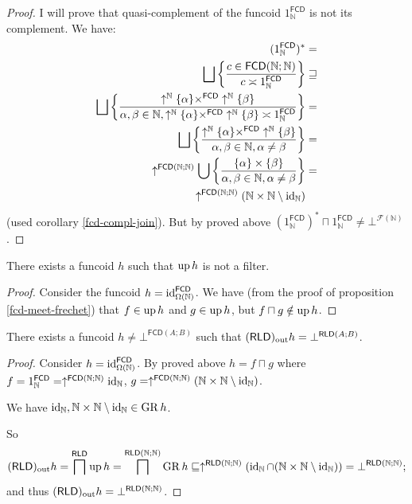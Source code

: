 \begin{proof}
I will prove that quasi-complement of the funcoid $1_{\mathbb{N}}^{\mathsf{FCD}}$
is not its complement. We have:
\begin{align*}
(1_{\mathbb{N}}^{\mathsf{FCD}})^{\ast} & =\\
\bigsqcup\left\{ \frac{c\in\mathsf{FCD}(\mathbb{N};\mathbb{N})}{c\asymp1_{\mathbb{N}}^{\mathsf{FCD}}}\right\} & \sqsupseteq\\
\bigsqcup\left\{ \frac{\uparrow^{\mathbb{N}}\{\alpha\}\times^{\mathsf{FCD}}\uparrow^{\mathbb{N}}\{\beta\}}{\alpha,\beta\in\mathbb{N},\uparrow^{\mathbb{N}}\{\alpha\}\times^{\mathsf{FCD}}\uparrow^{\mathbb{N}}\{\beta\}\asymp1_{\mathbb{N}}^{\mathsf{FCD}}}\right\} & =\\
\bigsqcup\left\{ \frac{\uparrow^{\mathbb{N}}\{\alpha\}\times^{\mathsf{FCD}}\uparrow^{\mathbb{N}}\{\beta\}}{\alpha,\beta\in\mathbb{N},\alpha\ne\beta}\right\} & =\\
\uparrow^{\mathsf{FCD}(\mathbb{N};\mathbb{N})}\bigcup\left\{ \frac{\{\alpha\}\times\{\beta\}}{\alpha,\beta\in\mathbb{N},\alpha\ne\beta}\right\} & =\\
\uparrow^{\mathsf{FCD}(\mathbb{N};\mathbb{N})}(\mathbb{N}\times\mathbb{N}\setminus\operatorname{id}_{\mathbb{N}})
\end{align*}
(used corollary \ref{fcd-compl-join}). But by proved above $(1_{\mathbb{N}}^{\mathsf{FCD}})^{\ast}\sqcap1_{\mathbb{N}}^{\mathsf{FCD}}\ne\bot^{\mathscr{F}(\mathbb{N})}$.\end{proof}
\begin{example}
There exists a funcoid $h$ such that $\operatorname{up} h$ is not a filter.\end{example}
\begin{proof}
Consider the funcoid $h=\operatorname{id}_{\Omega(\mathbb{N})}^{\mathsf{FCD}}$.
We have (from the proof of proposition \ref{fcd-meet-frechet}) that
$f\in\operatorname{up} h$ and $g\in\operatorname{up} h$, but $f\sqcap g\notin\operatorname{up} h$.\end{proof}
\begin{example}
There exists a funcoid $h\ne\bot^{\mathsf{FCD}(A;B)}$ such that $(\mathsf{RLD})_{\mathrm{out}} h=\bot^{\mathsf{RLD}(A;B)}$.\end{example}
\begin{proof}
Consider $h=\operatorname{id}_{\Omega(\mathbb{N})}^{\mathsf{FCD}}$. By proved above
$h=f\sqcap g$ where $f=1_{\mathbb{N}}^{\mathsf{FCD}}=\uparrow^{\mathsf{FCD}(\mathbb{N};\mathbb{N})}\operatorname{id}_{\mathbb{N}}$,
$g=\uparrow^{\mathsf{FCD}(\mathbb{N};\mathbb{N})}(\mathbb{N}\times\mathbb{N}\setminus\operatorname{id}_{\mathbb{N}})$.

We have $\operatorname{id}_{\mathbb{N}},\mathbb{N}\times\mathbb{N}\setminus\operatorname{id}_{\mathbb{N}}\in\operatorname{GR} h$.

So
\[
(\mathsf{RLD})_{\mathrm{out}} h=\bigsqcap^{\mathsf{RLD}}\operatorname{up} h=\bigsqcap^{\mathsf{RLD}(\mathbb{N};\mathbb{N})}\operatorname{GR} h\sqsubseteq\uparrow^{\mathsf{RLD}(\mathbb{N};\mathbb{N})}(\operatorname{id}_{\mathbb{N}}\cap(\mathbb{N}\times\mathbb{N}\setminus\operatorname{id}_{\mathbb{N}}))=\bot^{\mathsf{RLD}(\mathbb{N};\mathbb{N})};
\]
and thus $(\mathsf{RLD})_{\mathrm{out}} h=\bot^{\mathsf{RLD}(\mathbb{N};\mathbb{N})}$.\end{proof}
